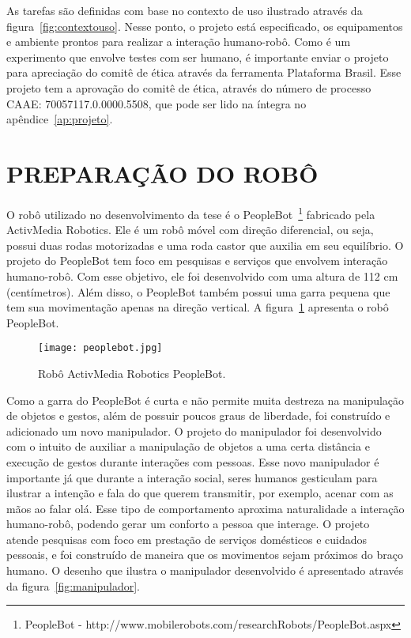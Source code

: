 As tarefas são definidas com base no contexto de uso ilustrado através da figura~\ref{fig:contextouso}. Nesse ponto, o projeto está especificado, os equipamentos e ambiente prontos para realizar a interação humano-robô. Como é um experimento que envolve testes com ser humano, é importante enviar o projeto para apreciação do comitê de ética através da ferramenta Plataforma Brasil. Esse projeto tem a aprovação do comitê de ética, através do número de processo CAAE: 70057117.0.0000.5508, que pode ser lido na íntegra no apêndice~\ref{ap:projeto}.

\section{PREPARAÇÃO DO ROBÔ}
\label{sec:ec_robo}
O robô utilizado no desenvolvimento da tese é o PeopleBot~\footnote{PeopleBot - http://www.mobilerobots.com/researchRobots/PeopleBot.aspx} fabricado pela ActivMedia Robotics. Ele é um robô móvel com direção diferencial, ou seja, possui duas rodas motorizadas e uma roda castor que auxilia em seu equilíbrio. O projeto do PeopleBot tem foco em pesquisas e serviços que envolvem interação humano-robô. Com esse objetivo, ele foi desenvolvido com uma altura de 112 cm (centímetros). Além disso, o PeopleBot também possui uma garra pequena que tem sua movimentação apenas na direção vertical. A figura~\ref{fig:peoplebot} apresenta o robô PeopleBot.

\begin{figure}[ht!]
	\centering
	\begin{minipage}{\textwidth}
		\caption{Robô ActivMedia Robotics PeopleBot.}
		\texttt{[image: peoplebot.jpg]}
		\label{fig:peoplebot}
	\end{minipage}
\end{figure}

Como a garra do PeopleBot é curta e não permite muita destreza na manipulação de objetos e gestos, além de possuir poucos graus de liberdade, foi construído e adicionado um novo manipulador. O projeto do manipulador foi desenvolvido com o intuito de auxiliar a manipulação de objetos a uma certa distância e execução de gestos durante interações com pessoas. Esse novo manipulador é importante já que durante a interação social, seres humanos gesticulam para ilustrar a intenção e fala do que querem transmitir, por exemplo, acenar com as mãos ao falar olá. Esse tipo de comportamento aproxima naturalidade a interação humano-robô, podendo gerar um conforto a pessoa que interage. O projeto atende pesquisas com foco em prestação de serviços domésticos e cuidados pessoais, e foi construído de maneira que os movimentos sejam próximos do braço humano. O desenho que ilustra o manipulador desenvolvido é apresentado através da figura~\ref{fig:manipulador}. 

